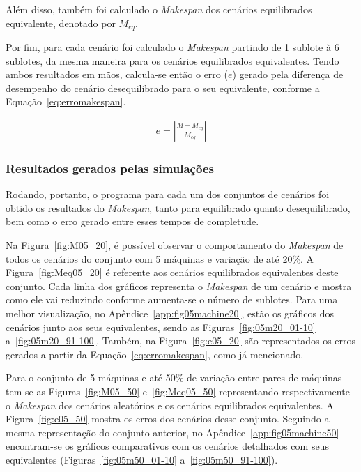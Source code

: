     Além disso, também foi calculado o \textit{Makespan} dos cenários equilibrados equivalente, denotado por $M_{eq}$.
    
    Por fim, para cada cenário foi calculado o \textit{Makespan} partindo de 1 sublote à 6 sublotes, da mesma maneira para os cenários equilibrados equivalentes. Tendo ambos resultados em mãos, calcula-se então o erro ($e$) gerado pela diferença de desempenho do cenário desequilibrado para o seu equivalente, conforme a Equação~\ref{eq:erromakespan}.
    
    \begin{eqnarray}
        e = \left|\frac{M - M_{eq}}{M_{eq}}\right|
        \label{eq:erromakespan}
    \end{eqnarray}
    
    
    \subsubsection{Resultados gerados pelas simulações}
    
    Rodando, portanto, o programa para cada um dos conjuntos de cenários foi obtido os resultados do \textit{Makespan}, tanto para equilibrado quanto desequilibrado, bem como o erro gerado entre esses tempos de completude. 
    
    Na Figura~\ref{fig:M05_20}, é possível observar o comportamento do \textit{Makespan} de todos os cenários do conjunto com 5 máquinas e variação de até 20\%. A Figura~\ref{fig:Meq05_20} é referente aos cenários equilibrados equivalentes deste conjunto. Cada linha dos gráficos representa o \textit{Makespan} de um cenário e mostra como ele vai reduzindo conforme aumenta-se o número de sublotes. Para uma melhor visualização, no Apêndice~\ref{app:fig05machine20}, estão os gráficos dos cenários junto aos seus equivalentes, sendo as Figuras~\ref{fig:05m20_01-10} a~\ref{fig:05m20_91-100}. Também, na Figura~\ref{fig:e05_20} são representados os erros gerados a partir da Equação~\ref{eq:erromakespan}, como já mencionado. 
    
    
    
    
    
    
    
    Para o conjunto de 5 máquinas e até 50\% de variação entre pares de máquinas tem-se as Figuras~\ref{fig:M05_50} e~\ref{fig:Meq05_50} representando respectivamente o \textit{Makespan} dos cenários aleatórios e os cenários equilibrados equivalentes. A Figura~\ref{fig:e05_50} mostra os erros dos cenários desse conjunto. Seguindo a mesma representação do conjunto anterior, no Apêndice~\ref{app:fig05machine50} encontram-se os gráficos comparativos com os cenários detalhados com seus equivalentes (Figuras~\ref{fig:05m50_01-10} a~\ref{fig:05m50_91-100}).
    
